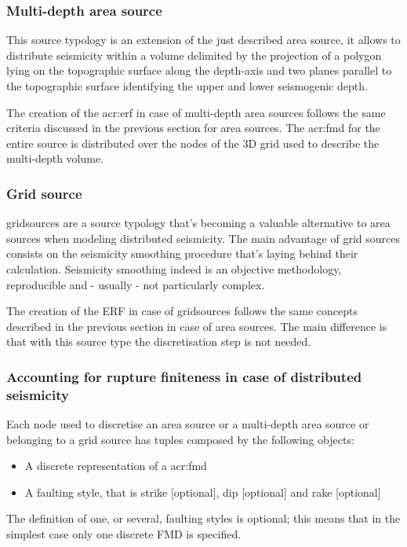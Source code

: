 \subsubsection{Multi-depth area source}
%
This source typology is an extension of the just described area source, 
it allows to distribute seismicity within a volume delimited by the 
projection of a polygon lying on the topographic surface along the 
depth-axis and two planes parallel to the topographic surface 
identifying the upper and lower seismogenic depth.

The creation of the \gls{acr:erf} in case of multi-depth area sources
follows the same criteria discussed in the previous section for area
sources. The \gls{acr:fmd} for the entire source is distributed over 
the nodes of the 3D grid used to describe the multi-depth volume.
%
\subsubsection{Grid source}
\Glspl{gridsource} are a source typology that's becoming a valuable alternative
to area sources when modeling distributed seismicity. 
%
The main advantage of grid sources consists on the seismicity smoothing 
procedure that's laying behind their calculation. Seismicity smoothing 
indeed is an objective methodology, reproducible and - usually - not
particularly complex. 

The creation of the ERF in case of \glspl{gridsource} follows the same 
concepts described in the previous section in case of area sources. 
%
The main difference is that with this source type the discretisation step 
is not needed.

\subsubsection{Accounting for rupture finiteness in case of distributed 
seismicity}
%
Each node used to discretise an area source or a multi-depth area 
source or belonging to a grid source has tuples composed by 
the following objects:
\begin{itemize}
\item A discrete representation of a \gls{acr:fmd} 
\item A faulting style, that is strike [optional], dip [optional] and 
rake [optional] 
\end{itemize}
The definition of one, or several, faulting styles is optional; this 
means that in the simplest case only one discrete FMD is specified.

